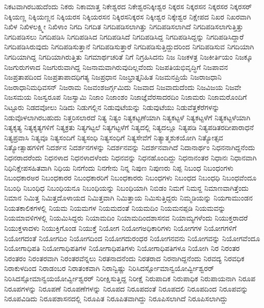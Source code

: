 {ನಿಕಟವಾಗಿರಬಹುದೆಂದು
ನಿಕರು
ನಿಕಾಮಾತ್ತ
ನಿಕೇಶ್ವರದ
ನಿಕೇಶ್ವರನಿಕ್ಕೀಶ್ವರ
ನಿಕ್ಕರಸ
ನಿಕ್ಕರಸನ
ನಿಕ್ಕರಸರ
ನಿಕ್ಕರಸರ್
ನಿಕ್ಕಿಯಣ್ಣ
ನಿಕ್ಕಿಯಣ್ಣನ
ನಿಕ್ಕಿಯರಸ
ನಿಕ್ಕಿಯರಸನ
ನಿಕ್ಕಿರಸನಿಕ್ಕರಸ
ನಿಕ್ಕೀಶ್ವರ
ನಿಕ್ಕೇಶ್ವರ
ನಿಕ್ಷೇಪದ
ನಿಖರ
ನಿಖರವಾಗಿ
ನಿಖಿಳ
ನಿಖಿಳಲಕ್ಷ್ಮೀ
ನಿಖಿಳಾಂ
ನಿಗದಿ
ನಿಗದಿತ
ನಿಗದಿಪಡಿಸಲಾಗಿತ್ತು
ನಿಗದಿಪಡಿಸಲಾಗಿದೆ
ನಿಗದಿಪಡಿಸಲಾಗುತ್ತಿತ್ತು
ನಿಗದಿಪಡಿಸಲು
ನಿಗದಿಪಡಿಸಿ
ನಿಗದಿಪಡಿಸಿದ
ನಿಗದಿಪಡಿಸಿದೆ
ನಿಗದಿಪಡಿಸಿದ್ದ
ನಿಗದಿಪಡಿಸಿದ್ದನ್ನು
ನಿಗದಿಪಡಿಸಿದ್ದಾರೆ
ನಿಗದಿಪಡಿಸಿರುವುದು
ನಿಗದಿಪಡಿಸುತ್ತಾನೆ
ನಿಗದಿಪಡಿಸುತ್ತಾರೆ
ನಿಗದಿಪಡಿಸುತ್ತಿದ್ದುದರಿಂದ
ನಿಗದಿಪಡಿಸುವ
ನಿಗದಿಯಾಗಿ
ನಿಗದಿಯಾಗಿದ್ದ
ನಿಗದಿಯಾಗಿರುತ್ತಿತು
ನಿಗಮಾರ್ಥಚರಿತೆ
ನಿಗೆ
ನಿಗ್ರಹಿಸಿದನು
ನಿಜ
ನಿಜಕಳತ್ರ
ನಿಜಕೀರ್ತಿಯಂ
ನಿಜಕ್ಕೂ
ನಿಜಗುರುಗಳಾದ
ನಿಜಗುರುವಾಗಿದ್ದ
ನಿಜನಾಮವಾಗಿರುವುದಿಲ್ಲವೆಂದು
ನಿಜಪತಿಯಭಿವೃದ್ಧಿಗೆ
ನಿಜಪಾವನ
ನಿಜಪ್ರತಾಪದಿಂದ
ನಿಜಪ್ರತಾಪಾದಧಿಗತ್ಯ
ನಿಜಪ್ರಧಾನ
ನಿಜಭ್ರಾತ್ತೃನಿಹಿತ
ನಿಜಮನಪ್ರಿಯೆ
ನಿಜರಾಜಧಾನಿ
ನಿಜರಾಧಾನಿಮಧಿವಸನ್
ನಿಜರಾಮ
ನಿಜವಂಶಜರ್ಗ್ಗಮಿದು
ನಿಜವಾದ
ನಿಜವಾದುದೆಂದು
ನಿಜವಿಜಯ
ನಿಜವೇ
ನಿಜಸಮಯ
ನಿಜಸ್ವರೂಪ
ನಿಜಸ್ವಾಮಿ
ನಿಜಾಂ
ನಿಜಾಂಶಂ
ನಿಜಾಜ್ಞೆವೆರಸಾದರದಿಂ
ನಿಜಾಮರು
ನಿಜಾಮರೊಂದಿಗೆ
ನಿಟ್ಟೂರು
ನಿಡದವೋಲು
ನಿಡಿದು
ನಿಡುಗಲ್ಲಿನ
ನಿಡುವುಟೆಯನ್ನು
ನಿಡುವುಟೆಯು
ನಿಡುವೆತ್ತಕೆರೆಗಳನ್ನು
ನಿಡುವೊಳಲಾಗಿರಬಹುದು
ನಿತ್ತರಿಸಲಾರದೆ
ನಿತ್ಯ
ನಿತ್ಯಂ
ನಿತ್ಯಕಟ್ಟಣೆಯಾಗಿ
ನಿತ್ಯಕಟ್ಟಳೆ
ನಿತ್ಯಕಟ್ಟಳೆಗೆ
ನಿತ್ಯಕಟ್ಟಳೆಯಾಗಿ
ನಿತ್ಯಕೃತ್ಯ
ನಿತ್ಯಕೃತ್ಯಗಳಿಗೆ
ನಿತ್ಯಕ್ರತು
ನಿತ್ಯಗಟ್ಟಲೆ
ನಿತ್ಯಗಟ್ಟಳೆಗೆ
ನಿತ್ಯದಲ್ಲಿ
ನಿತ್ಯದಲ್ಲೂ
ನಿತ್ಯಪಡಿ
ನಿತ್ಯಪಡಿತರದೀಪಾರಾಧನೆ
ನಿತ್ಯಪ್ರವಾಸಿ
ನಿತ್ಯವೂ
ನಿತ್ಯಸಂದಿಗೆ
ನಿತ್ಯಸಂಧಿ
ನಿತ್ಯಸಂಧಿಗೆ
ನಿತ್ಯಸೇವೆಗೆ
ನಿತ್ಯಾತ್ಮಶುಕಯೋಗಿ
ನಿತ್ಯೋತ್ಸವ
ನಿತ್ಯೋತ್ಸಾಹಗಳಿಗೆ
ನಿದರ್ಶನ
ನಿದರ್ಶನಗಳನ್ನು
ನಿದರ್ಶನವನ್ನು
ನಿದರ್ಶನವಾಗಿದೆ
ನಿದಾನಾರ್ಥಂ
ನಿಧನನಾಗಿದ್ದನೆಂದು
ನಿಧನರಾದರೆಂದು
ನಿಧನಳಾದ
ನಿಧನಳಾದಳೆಂದು
ನಿಧನವನ್ನು
ನಿಧನಹೊಂದಿದ್ದು
ನಿಧನಾನಂತರ
ನಿಧಾನಃ
ನಿಧಾನವಾಗಿ
ನಿಧಿನಿಕ್ಷೇಪಸಹಿತವಾಗಿ
ನಿಧಿಯ
ನಿನಗೆಂದು
ನಿನಗೇನು
ನಿನ್ನ
ನಿಪುಣ
ನಿಪುಣರು
ನಿಪ್ಪ
ನಿಬಂಧ
ನಿಬಂಧಂಗಳು
ನಿಬಂಧಕಾರಅರ
ನಿಬಂಧಕಾರರ
ನಿಬಂಧಕಾರರಿಗೆ
ನಿಬಂಧಕಾರರು
ನಿಬಂಧಗಳು
ನಿಬಂಧದ
ನಿಬಂಧಧಿ
ನಿಬಂಧವೆಂದೂ
ನಿಬಂಧಿ
ನಿಬಂಧಿಧ
ನಿಬಂಧಿಯನೂ
ನಿಬಂಧಿಯನ್ನು
ನಿಬಂಧಿಯಾಗಿ
ನಿಬಿಡಂ
ನಿಮಗೆ
ನಿಮನ್ದ
ನಿಮಾಣವಾಗಿತ್ತೆಂದು
ನಿಮಾನ
ನಿಮಿತ್ತ
ನಿಮಿತ್ತದೊಳಾಯದ
ನಿಮಿತ್ತವಾಗಿ
ನಿಮಿತ್ತಾಯ
ನಿಮಿಸುತ್ತಿದ್ದರು
ನಿಮ್ಮಡಿಯನ್ನು
ನಿಯಗಾಮುಂಡನ
ನಿಯತಕಾಲಿಕಗಳಲ್ಲಿ
ನಿಯಮ
ನಿಯಮಗಳ
ನಿಯಮದಂತೆ
ನಿಯಮದಿಂ
ನಿಯಮನಪ್ಪಡಿ
ನಿಯಮವನ್ನು
ನಿಯಮಾವಳಿಗಳಲ್ಲಿ
ನಿಯಮಿಸಿದ್ದರು
ನಿಯಾಮದಿಂ
ನಿಯಾಮದಿಂದಶಾಸನವ
ನಿಯಾಮ್ಯಗಳೆಂದು
ನಿಯುಕ್ತರಾದರೆ
ನಿಯುಕ್ತಳಾದಳು
ನಿಯುಕ್ತಿಗೊಂಡ
ನಿಯುಕ್ತೆ
ನಿಯೋಗ
ನಿಯೋಗಅಧಿಕಾರಿಗಳು
ನಿಯೋಗಗಳ
ನಿಯೋಗಗಳಿಗೆ
ನಿಯೋಗದಂತೆ
ನಿಯೋಗದಿಂ
ನಿಯೋಗದಿಂದ
ನಿಯೋಗದುರಂಧರ
ನಿಯೋಗನವನು
ನಿಯೋಗವನ್ನು
ನಿಯೋಗವೆಂದೂ
ನಿಯೋಗಾಧಿಪತಿ
ನಿಯೋಗಾಧಿಪತಿಗಳ
ನಿಯೋಗಾಧಿಪತಿಗಳು
ನಿಯೋಗಾಧಿಪತಿಗಳೂ
ನಿಯೋಗಿ
ನಿರ
ನಿರಂತರ
ನಿರಂತರಂ
ನಿರಂತರವಾಗಿ
ನಿರಂತರವೆನ್ನಲು
ನಿರತನಾದನೆಂದು
ನಿರತರಾದ
ನಿರನಾಗಿದ್ದನೆಂದು
ನಿರವದ್ಯ
ನಿರವಧಿಕ
ನಿರಾಕುಳದಿಂದ
ನಿರಾಡಂಬರ
ನಿರಾತಂಕವಾಗಿ
ನಿರಾನ್ವಿಷ್ಣು
ನಿರಿಸಿದರ್ಸ್ಸೋಮಾನ್ವಯೋರ್ವ್ವೀಶ್ವರರ್
ನಿರಿಸಿದಸ್ಸೋಮಾನ್ವಯಯೋರ್ವ್ವೀಶ್ವರರ್
ನಿರೀಕ್ಷಿಸುತ್ತಿದ್ದ
ನಿರೀಕ್ಷೆ
ನಿರುಪಾದಿಕ
ನಿರುಪಾಧಿಕ
ನಿರುಪಾಯನಾಗಿ
ನಿರೂಪ
ನಿರೂಪಗಳನ್ನು
ನಿರೂಪಣೆ
ನಿರೂಪಣೆಗಳನ್ನು
ನಿರೂಪದ
ನಿರೂಪದಂತೆ
ನಿರೂಪದಲಿ
ನಿರೂಪದಿಂದ
ನಿರೂಪವನ್ನು
ನಿರೂಪವಿಡಿದು
ನಿರೂಪಶಾಸನದಲ್ಲಿ
ನಿರೂಪಿತ
ನಿರೂಪಿತವಾಗಿದ್ದು
ನಿರೂಪಿಸಲಾಗಿದೆ
ನಿರೂಪಿಸಲಾಗಿದ್ದು
}
